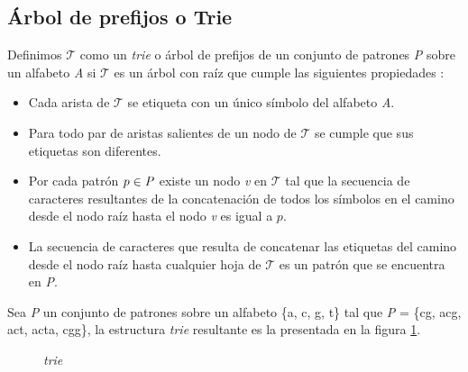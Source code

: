 \subsection{Árbol de prefijos o Trie}
\label{sec:deftrie}
Definimos $\mathcal{T}$ como un \emph{trie} o árbol de prefijos de un conjunto de patrones {\emph P} sobre un alfabeto {\it A} si $\mathcal{T}$ es un árbol con raíz que cumple las siguientes propiedades \cite{GUS}:
\begin{itemize}
\item Cada arista de $\mathcal{T}$ se etiqueta con un único símbolo del alfabeto {\it A}.
\item Para todo par de aristas salientes de un nodo de $\mathcal{T}$ se cumple que sus etiquetas son diferentes.
\item Por cada patrón $p \in {\it P}$ existe un nodo {\it v} en $\mathcal{T}$ tal que la secuencia de caracteres resultantes de la concatenación de todos los símbolos en el camino desde el nodo raíz hasta el nodo {\it v} es igual a $p$.
\item La secuencia de caracteres que resulta de concatenar las etiquetas del camino desde el nodo raíz hasta cualquier hoja de $\mathcal{T}$ es un patrón que se encuentra en {\emph P}.
\end{itemize}
\begin{example*}
\label{ex:example1}
Sea \emph{P} un conjunto de patrones sobre un alfabeto \{a, c, g, t\} tal que \emph {P} = \{cg, acg, act, acta, cgg\}, la estructura {\it trie} resultante es la presentada en la figura \ref{fig:trie}. 
\begin{figure}[H]
\centering
{}
\caption[Ejemplo: trie]{{\it trie}}
	\label{fig:trie}
\end{figure}
\end{example*}
